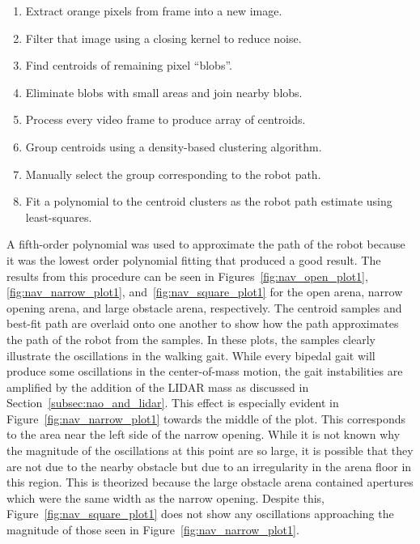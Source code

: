 \begin{enumerate}
  \item Extract orange pixels from frame into a new image.
  \item Filter that image using a closing kernel to reduce noise.
  \item Find centroids of remaining pixel ``blobs''.
  \item Eliminate blobs with small areas and join nearby blobs.
  \item Process every video frame to produce array of centroids.
  \item Group centroids using a density-based clustering algorithm.
  \item Manually select the group corresponding to the robot path.
  \item Fit a polynomial to the centroid clusters as the robot path estimate using least-squares.
\end{enumerate}

A fifth-order polynomial was used to approximate the path of the robot because it was the lowest order polynomial fitting that produced a good result.
The results from this procedure can be seen in Figures~\ref{fig:nav_open_plot1},
\ref{fig:nav_narrow_plot1}, and~\ref{fig:nav_square_plot1} for the open arena, narrow opening
arena, and large obstacle arena, respectively. The centroid samples and best-fit path are
overlaid onto one another to show how the path approximates the path of the robot from the
samples. In these plots, the samples clearly illustrate the oscillations in the walking gait.
While every bipedal gait will produce some oscillations in the center-of-mass motion,
the gait instabilities are amplified by the addition of the LIDAR mass as discussed in 
Section~\ref{subsec:nao_and_lidar}. This effect is especially evident in Figure~\ref{fig:nav_narrow_plot1}
towards the middle of the plot. This corresponds to the area near the left side of the narrow
opening. While it is not known why the magnitude of the oscillations at this point are so large,
it is possible that they are not due to the nearby obstacle but due to an irregularity in the
arena floor in this region. This is theorized because the large obstacle arena contained apertures
which were the same width as the narrow opening. Despite this, Figure~\ref{fig:nav_square_plot1} 
does not show any oscillations approaching the magnitude of those seen in Figure~\ref{fig:nav_narrow_plot1}.

